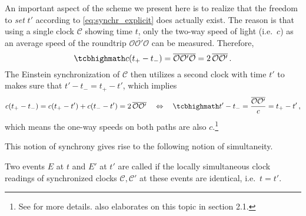 An important aspect of the scheme we present here is to realize that the freedom to \emph{set} $t'$ according to \eqref{eq:synchr_explicit} does actually exist. The reason is that using a single clock $\mathcal{C}$ showing time $t$, only the two-way speed of light (i.e.~$c$) as an average speed of the roundtrip $\overline{\mathcal{O} \mathcal{O}' \mathcal{O}}$ can be measured. Therefore, 
\begin{equation}\label{eq:two_way_light_speed}
	\eqbox{
	c (t_+ - t_-) = \overline{\mathcal{O} \mathcal{O}' \mathcal{O}} = 2 \, \overline{\mathcal{O} \mathcal{O}'}
	} \, .
\end{equation}
The Einstein synchronization of $\mathcal{C}$ then utilizes a second clock with time $t'$ to makes sure that $t' - t_- = t_+ - t'$, which implies
\begin{equation}\label{eq:one_way_light_speed}
	 c (t_+ - t_-) = c (t_+ - t') + c (t_- - t') = 2 \, \overline{\mathcal{O} \mathcal{O}'}
	\quad \Leftrightarrow \quad
	\eqbox{
	t' - t_- = \frac{\overline{\mathcal{O} \mathcal{O}'}}{c} = t_+ - t'
	} \, ,
\end{equation}
which means the one-way speeds on both paths are also $c$.\footnote{See \cite{Minguzzi_2003} for more details. \cite{giulini_srt} also elaborates on this topic in section 2.1.}


This notion of synchrony gives rise to the following notion of simultaneity.
\begin{defi}[Simultaneity]\label{defi:simultaneity}
	Two events $E$ at $t$ and $E'$ at $t'$ are called  if the locally simultaneous clock readings of synchronized clocks $\mathcal{C}, \mathcal{C}'$ at these events are identical, i.e.~$t = t'$.
\end{defi}


